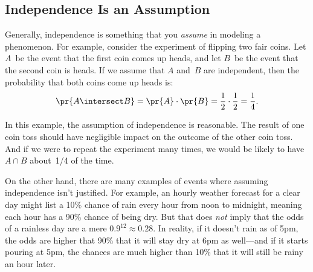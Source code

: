 \subsection{Independence Is an Assumption}

Generally, independence is something that you \emph{assume} in
modeling a phenomenon.  For example, consider the experiment of
flipping two fair coins.  Let $A$~be the event that the first coin
comes up heads, and let $B$~be the event that the second coin is
heads.  If we assume that $A$ and~$B$ are independent, then the
probability that both coins come up heads is:
%
\begin{equation*}
\pr{A \intersect B}  = \pr{A} \cdot \pr{B} %
               = \frac{1}{2} \cdot \frac{1}{2} %
               = \frac{1}{4}.
\end{equation*}

In this example, the assumption of independence is reasonable.  The
result of one coin toss should have negligible impact on the outcome
of the other coin toss.  And if we were to repeat the experiment many
times, we would be likely to have~$A \cap B$ about~1/4 of the time.

On the other hand, there are many examples of events where assuming
independence isn't justified.  For example, an hourly weather forecast
for a clear day might list a 10\% chance of rain every hour from noon
to midnight, meaning each hour has a 90\% chance of being dry.  But
that does \emph{not} imply that the odds of a rainless day are a mere
$0.9^{12} \approx 0.28$.  In reality, if it doesn't rain as of 5pm,
the odds are higher that 90\% that it will stay dry at 6pm as
well---and if it starts pouring at 5pm, the chances are much higher
than 10\% that it will still be rainy an hour later.


\iffalse
let $C$~be the
event that tomorrow is cloudy and $R$ be the event that tomorrow is
rainy.  Perhaps $\pr{C} = 1/5$ and $\pr{R} = 1/10$ in Boston.  If
these events were independent, then we could conclude that the
probability of a rainy, cloudy day was quite small:
%
\begin{equation*}
\pr{R \intersect C} = \pr{R} \cdot \pr{C} %
               = \frac{1}{5} \cdot \frac{1}{10} %
               = \frac{1}{50}.
\end{equation*}
%
Unfortunately, these events are definitely not independent; in
particular, every rainy day is cloudy.  Thus, the probability of a
rainy, cloudy day is actually~$1/10$.
\fi

